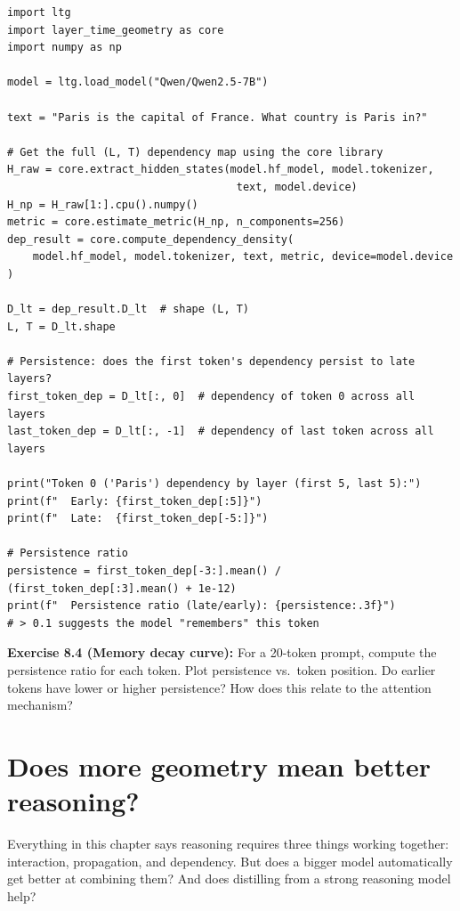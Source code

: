 \documentclass[11pt, twoside, openright]{memoir}
\begin{document}
\begin{lstlisting}[caption={Measuring functional memory via dependency persistence}]
import ltg
import layer_time_geometry as core
import numpy as np

model = ltg.load_model("Qwen/Qwen2.5-7B")

text = "Paris is the capital of France. What country is Paris in?"

# Get the full (L, T) dependency map using the core library
H_raw = core.extract_hidden_states(model.hf_model, model.tokenizer,
                                    text, model.device)
H_np = H_raw[1:].cpu().numpy()
metric = core.estimate_metric(H_np, n_components=256)
dep_result = core.compute_dependency_density(
    model.hf_model, model.tokenizer, text, metric, device=model.device
)

D_lt = dep_result.D_lt  # shape (L, T)
L, T = D_lt.shape

# Persistence: does the first token's dependency persist to late layers?
first_token_dep = D_lt[:, 0]  # dependency of token 0 across all layers
last_token_dep = D_lt[:, -1]  # dependency of last token across all layers

print("Token 0 ('Paris') dependency by layer (first 5, last 5):")
print(f"  Early: {first_token_dep[:5]}")
print(f"  Late:  {first_token_dep[-5:]}")

# Persistence ratio
persistence = first_token_dep[-3:].mean() / (first_token_dep[:3].mean() + 1e-12)
print(f"  Persistence ratio (late/early): {persistence:.3f}")
# > 0.1 suggests the model "remembers" this token
\end{lstlisting}

\begin{tryit}
\textbf{Exercise 8.4 (Memory decay curve):} For a 20-token prompt, compute
the persistence ratio for each token. Plot persistence vs.\ token position.
Do earlier tokens have lower or higher persistence? How does this relate to
the attention mechanism?
\end{tryit}


\section{Does more geometry mean better reasoning?}
\label{sec:scaling-capacity}

Everything in this chapter says reasoning requires three things working
together: interaction, propagation, and dependency. But does a bigger model
automatically get better at combining them? And does distilling from a
strong reasoning model help?
\end{document}
